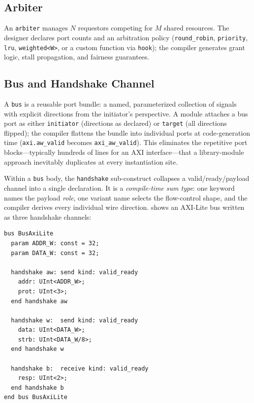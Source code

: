 \documentclass[11pt,twocolumn]{article}
\begin{document}
\subsection{Arbiter}

An \texttt{arbiter} manages $N$ requestors competing for $M$ shared resources. The designer declares port counts and an arbitration policy (\texttt{round\_robin}, \texttt{priority}, \texttt{lru}, \texttt{weighted<W>}, or a custom function via \texttt{hook}); the compiler generates grant logic, stall propagation, and fairness guarantees.

\subsection{Bus and Handshake Channel}\label{sec:bus}

A \texttt{bus} is a reusable port bundle: a named, parameterized collection of signals with explicit directions from the initiator's perspective. A module attaches a bus port as either \texttt{initiator} (directions as declared) or \texttt{target} (all directions flipped); the compiler flattens the bundle into individual ports at code-generation time (\texttt{axi.aw\_valid} becomes \texttt{axi\_aw\_valid}). This eliminates the repetitive port blocks---typically hundreds of lines for an AXI interface---that a library-module approach inevitably duplicates at every instantiation site.

Within a \texttt{bus} body, the \texttt{handshake} sub-construct collapses a valid/ready/payload channel into a single declaration. It is a \emph{compile-time sum type}: one keyword names the payload \emph{role}, one variant name selects the flow-control shape, and the compiler derives every individual wire direction.  shows an AXI-Lite bus written as three handshake channels:

\begin{lstlisting}[language=Arch,caption={AXI-Lite as three handshake channels},label={lst:handshake}]
bus BusAxiLite
  param ADDR_W: const = 32;
  param DATA_W: const = 32;

  handshake aw: send kind: valid_ready
    addr: UInt<ADDR_W>;
    prot: UInt<3>;
  end handshake aw

  handshake w:  send kind: valid_ready
    data: UInt<DATA_W>;
    strb: UInt<DATA_W/8>;
  end handshake w

  handshake b:  receive kind: valid_ready
    resp: UInt<2>;
  end handshake b
end bus BusAxiLite
\end{lstlisting}
\end{document}
